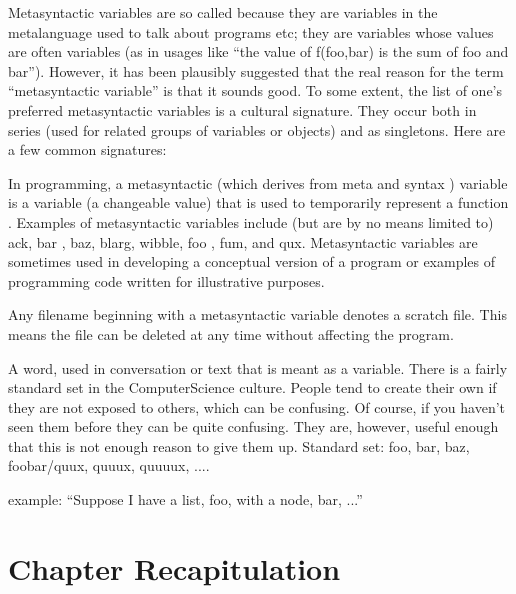 \documentclass[thesis-solanki.tex]{subfiles}
\begin{document}
Metasyntactic variables are so called because they are variables in the metalanguage used to talk about programs
etc; they are variables whose values are often variables (as in usages like ``the value of f(foo,bar) is
the sum of foo and bar'').
However, it has been plausibly suggested that the real reason for the term ``metasyntactic
variable'' is that it sounds good.
To some extent, the list of one's preferred metasyntactic variables is a cultural signature.
They occur both in series (used for related groups of variables or objects) and as singletons.
Here are a few common signatures:


\cite{webiste:metasyntacticvariableswhatistectarget}
In programming, a metasyntactic (which derives from meta and syntax ) variable is a variable (a changeable value) that is used to temporarily represent a function . Examples of metasyntactic variables include (but are by no means limited to) ack, bar , baz, blarg, wibble, foo , fum, and qux. Metasyntactic variables are sometimes used in developing a conceptual version of a program or examples of programming code written for illustrative purposes.

Any filename beginning with a metasyntactic variable denotes a scratch file. This means the file can be deleted at any time without affecting the program.



\cite{webste:metasyntacticvariablesc2wiki}

A word, used in conversation or text that is meant as a variable. There is a fairly standard set in the ComputerScience
culture. People tend to create their own if they are not exposed to others, which can be confusing. Of course, if you haven't seen them before they can be quite confusing. They are, however, useful enough that this is not enough reason to give them up.
Standard set: foo, bar, baz, foobar/quux, quuux, quuuux, ....

example: ``Suppose I have a list, foo, with a node, bar, ...''


\section{Chapter Recapitulation}

\ifMain
\begin{scope}
  \nolinenumbers
  \enotesize
  \par
  \begin{singlespace}
  \setlength{\parskip}{12pt plus 2pt minus 1pt}
  \theendnotes
  \par
  \end{singlespace}
\end{scope}
\fi
\end{document}
